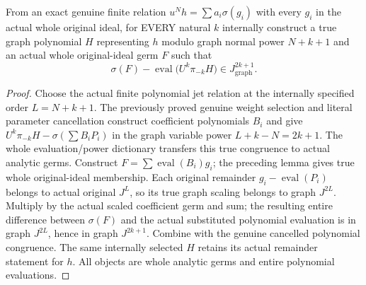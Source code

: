 \begin{theorem}
\label{hir:relative-normal-graph-weight-reconstruction-actual-analytic-jet}
\leanok
From an exact genuine finite relation $u^Nh=\sum a_i\sigma(g_i)$ with every $g_i$ in the actual whole original ideal, for EVERY natural $k$ internally construct a true graph polynomial $H$ representing $h$ modulo graph normal power $N+k+1$ and an actual whole original-ideal germ $F$ such that
\[\sigma(F)-\operatorname{eval}\bigl(U^k\pi_{-k}H\bigr)\in J_{\mathrm{graph}}^{2k+1}.\]
\end{theorem}
\begin{proof}
Choose the actual finite polynomial jet relation at the internally specified order $L=N+k+1$. The previously proved genuine weight selection and literal parameter cancellation construct coefficient polynomials $B_i$ and give $U^k\pi_{-k}H-\sigma(\sum B_iP_i)$ in the graph variable power $L+k-N=2k+1$. The whole evaluation/power dictionary transfers this true congruence to actual analytic germs. Construct $F=\sum\operatorname{eval}(B_i)g_i$; the preceding lemma gives true whole original-ideal membership. Each original remainder $g_i-\operatorname{eval}(P_i)$ belongs to actual original $J^L$, so its true graph scaling belongs to graph $J^{2L}$. Multiply by the actual scaled coefficient germ and sum; the resulting entire difference between $\sigma(F)$ and the actual substituted polynomial evaluation is in graph $J^{2L}$, hence in graph $J^{2k+1}$. Combine with the genuine cancelled polynomial congruence. The same internally selected $H$ retains its actual remainder statement for $h$. All objects are whole analytic germs and entire polynomial evaluations.
\end{proof}


